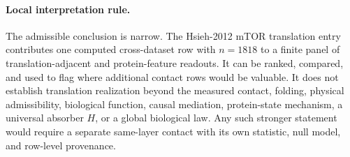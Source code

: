 \paragraph{Local interpretation rule.}
The admissible conclusion is narrow.  The Hsieh-2012 mTOR translation entry contributes one computed cross-dataset row with $n=1818$ to a finite panel of translation-adjacent and protein-feature readouts.  It can be ranked, compared, and used to flag where additional contact rows would be valuable.  It does not establish translation realization beyond the measured contact, folding, physical admissibility, biological function, causal mediation, protein-state mechanism, a universal absorber $H$, or a global biological law.  Any such stronger statement would require a separate same-layer contact with its own statistic, null model, and row-level provenance.